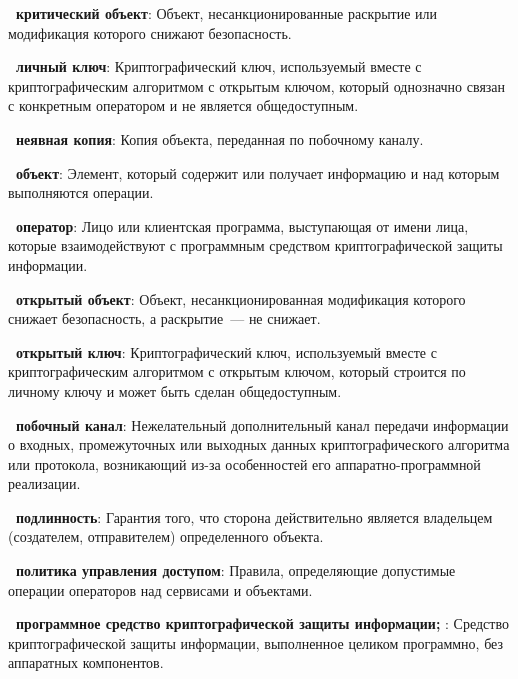 {\bf \thedefctr~критический объект}: 
Объект, несанкционированные раскрытие или модификация которого 
снижают безопасность.

{\bf \thedefctr~личный ключ}:
Криптографический ключ, используемый
вместе с криптографическим алгоритмом с открытым ключом, 
который однозначно связан с конкретным оператором 
и не является общедоступным.


{\bf \thedefctr~неявная копия}:
Копия объекта, переданная по побочному каналу.

{\bf \thedefctr~объект}: 
Элемент, который содержит или получает информацию
и над которым выполняются операции.

{\bf \thedefctr~оператор}:
Лицо или клиентская программа, выступающая от имени лица, 
которые взаимодействуют с программным средством криптографической защиты 
информации.

{\bf \thedefctr~открытый объект}: 
Объект, несанкционированная модификация 
которого снижает безопасность, 
а раскрытие~--- не снижает.

{\bf \thedefctr~открытый ключ}:
Криптографический ключ, используемый 
вместе с криптографическим алгоритмом с открытым ключом, 
который строится по личному ключу  
и может быть сделан общедоступным.


{\bf \thedefctr~побочный канал}:
Нежелательный дополнительный канал передачи информации о 
входных, промежуточных или выходных данных 
криптографического алгоритма или протокола, 
возникающий из-за особенностей его 
аппаратно-программной реализации.

{\bf \thedefctr~подлинность}:
Гарантия того, что сторона действительно 
является владельцем (создателем, отправителем) 
определенного объекта.

{\bf \thedefctr~политика управления доступом}:
Правила, определяющие допустимые операции 
операторов над сервисами и объектами.

{\bf \thedefctr~программное средство криптографической защиты информации;
\TOE}:
Средство криптографической защиты информации, выполненное целиком 
программно, без аппаратных компонентов.

